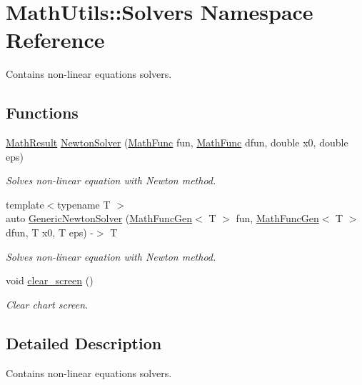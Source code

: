 \hypertarget{namespaceMathUtils_1_1Solvers}{\section{Math\-Utils\-:\-:Solvers Namespace Reference}
\label{namespaceMathUtils_1_1Solvers}
}


Contains non-\/linear equations solvers.  


\subsection*{Functions}
\begin{DoxyCompactItemize}
\item 
\hyperlink{structMathUtils_1_1Base_1_1MathResult}{Math\-Result} \hyperlink{namespaceMathUtils_1_1Solvers_a8344f30567335607eb5b93893735fac6}{Newton\-Solver} (\hyperlink{namespaceMathUtils_1_1Base_a655889e83691f7f82ec161684afa2c1f}{Math\-Func} fun, \hyperlink{namespaceMathUtils_1_1Base_a655889e83691f7f82ec161684afa2c1f}{Math\-Func} dfun, double x0, double eps)
\begin{DoxyCompactList}\small\item\em Solves non-\/linear equation with Newton method. \end{DoxyCompactList}\item 
{\footnotesize template$<$typename T $>$ }\\auto \hyperlink{namespaceMathUtils_1_1Solvers_a1246e6c5ed93ca1e44d76ec54fed56fd}{Generic\-Newton\-Solver} (\hyperlink{namespaceMathUtils_1_1Base_a99755ccc9707a5ae2e93b4d9fbeb4391}{Math\-Func\-Gen}$<$ T $>$ fun, \hyperlink{namespaceMathUtils_1_1Base_a99755ccc9707a5ae2e93b4d9fbeb4391}{Math\-Func\-Gen}$<$ T $>$ dfun, T x0, T eps) -\/$>$ T
\begin{DoxyCompactList}\small\item\em Solves non-\/linear equation with Newton method. \end{DoxyCompactList}\item 
void \hyperlink{namespaceMathUtils_1_1Solvers_a281e598bf9fc6362c92a4b71098235bc}{clear\-\_\-screen} ()
\begin{DoxyCompactList}\small\item\em Clear chart screen. \end{DoxyCompactList}\end{DoxyCompactItemize}


\subsection{Detailed Description}
Contains non-\/linear equations solvers. 

